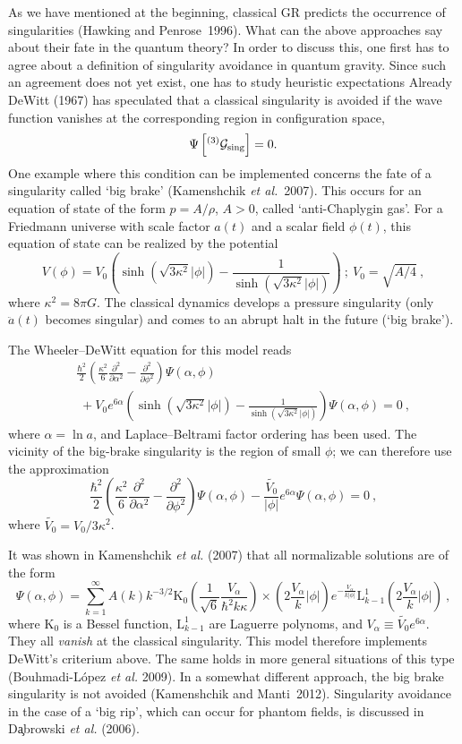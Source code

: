 \documentclass[12pt,a4paper]{article}
\newcommand{\be}{\begin{equation}}
\newcommand{\ee}{\end{equation}}
\newcommand{\bea}{\begin{eqnarray}}
\newcommand{\eea}{\end{eqnarray}}
\newcommand{\lb}{\label}
\newcommand{\bdm}{\begin{displaymath}}
\newcommand{\edm}{\end{displaymath}}
\begin{document}
As we have mentioned at the beginning, classical GR predicts the
occurrence of singularities (Hawking and Penrose~1996). What can the
above approaches say about their fate in the quantum theory? In order
to discuss this, one first has to agree about a definition of
singularity avoidance in quantum gravity. Since such an agreement does
not yet exist, one has to study heuristic expectations
Already DeWitt (1967) has speculated that a classical singularity is avoided
if the wave function vanishes at the corresponding region in
configuration space,
\be
\lb{8.3.0}
\Psi\left[{}^{(3)} {\mathcal G}_{\rm sing}\right]=0.
\ee
One example where this condition can be implemented concerns the fate
of a singularity called `big brake' (Kamenshchik {\em et al.}~2007).
This occurs for an
equation of state of the form $p=A/\rho$, $A>0$, called
`anti-Chaplygin gas'. 
For a Friedmann
universe with scale factor $a(t)$ and a scalar field $\phi(t)$, this
equation of state can be realized by the potential
\bdm
V(\phi)=V_0\left(\sinh{\left(\sqrt{3\kappa^2}|\phi|\right)}-
\frac1{\sinh{\left(\sqrt{3\kappa^2}|\phi|\right)}}\right)\ ; \ V_0=\sqrt{A/4}\ ,
\edm
where $\kappa^2=8\pi G$.
The classical dynamics 
develops a pressure singularity (only $\ddot{a}(t)$ becomes singular)
and comes to an abrupt halt in the future (`big brake').

The Wheeler--DeWitt equation for this model reads
\bea
& & \frac{\hbar^2}{2}\left(\frac{\kappa^2}{6}\frac{\partial^2}
{\partial\alpha^2}-\frac{\partial^2}{\partial\phi^2}\right)\Psi\left(\alpha,
  \phi\right)\nonumber\\ & & \;
+V_0e^{6\alpha}\left(\sinh{\left(\sqrt{3\kappa^2}|\phi|\right)}
-\frac1{\sinh{\left(\sqrt{3\kappa^2}|\phi|\right)}}\right)\Psi\left(\alpha, 
  \phi\right)=0\ ,
\eea
where $\alpha=\ln a$, and Laplace--Beltrami factor ordering
has been used. 
The vicinity of the big-brake singularity is the region of small
$\phi$; we can therefore use the approximation
\bdm
\frac{\hbar^2}2\left(\frac{\kappa^2}{6}\frac{\partial^2}{\partial\alpha^2}
-\frac{\partial^2}{\partial\phi^2}\right)\Psi\left(\alpha,
  \phi\right)-\frac{\tilde{V_0}}{|\phi|}e^{6\alpha}\Psi\left(\alpha,
  \phi\right)=0\ ,
\edm
where $\tilde{V_0}={V_0}/{3\kappa^2}$.

It was shown in Kamenshchik {\em et al.} (2007) that all normalizable
solutions are of the form 
\bdm
\Psi\left(\alpha,\phi\right)=
\sum_{k=1}^{\infty}A(k)k^{-3/2}\mathrm{K}_0
\left(\frac{1}{\sqrt{6}}\frac{V_{\alpha}}{\hbar^2k\kappa}\right)
\times\left(2\frac{V_\alpha}{k}|\phi|\right)
e^{-\frac{V_\alpha}{k|\phi|}}\mathrm{L}^1_{k-1}
\left(2\frac{V_\alpha}{k}|\phi|\right)\ ,
\edm
where $\mathrm{K}_0$ is a Bessel function, $\mathrm{L}^1_{k-1}$ are Laguerre
polynoms, and $V_\alpha\equiv\tilde{V_0}e^{6\alpha}$. They all {\em
  vanish} at the classical singularity. This model therefore
implements DeWitt's criterium above. The same holds in more general
situations of this type (Bouhmadi-L\'opez {\em et al.} 2009). In a
somewhat different approach, the big brake singularity is not avoided
(Kamenshchik and Manti~2012). Singularity avoidance in the case of a
`big rip', which can occur for phantom fields, is discussed in
D\c{a}browski {\em et al.} (2006). 
\end{document}
